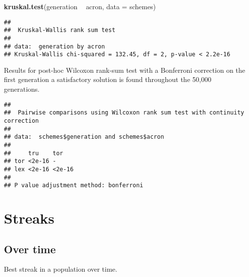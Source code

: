 \documentclass[]{book}
\newenvironment{Shaded}{\begin{snugshade}}{\end{snugshade}}
\newcommand{\DataTypeTok}[1]{\textcolor[rgb]{0.13,0.29,0.53}{#1}}
\newcommand{\KeywordTok}[1]{\textcolor[rgb]{0.13,0.29,0.53}{\textbf{#1}}}
\newcommand{\NormalTok}[1]{#1}
\newcommand{\OperatorTok}[1]{\textcolor[rgb]{0.81,0.36,0.00}{\textbf{#1}}}
\newcommand{\OtherTok}[1]{\textcolor[rgb]{0.56,0.35,0.01}{#1}}
\newcommand{\StringTok}[1]{\textcolor[rgb]{0.31,0.60,0.02}{#1}}
\begin{document}
\begin{Shaded}
\begin{Highlighting}[]
\KeywordTok{kruskal.test}\NormalTok{(generation }\OperatorTok{~}\StringTok{ }\NormalTok{acron, }\DataTypeTok{data =}\NormalTok{ schemes)}
\end{Highlighting}
\end{Shaded}

\begin{verbatim}
## 
##  Kruskal-Wallis rank sum test
## 
## data:  generation by acron
## Kruskal-Wallis chi-squared = 132.45, df = 2, p-value < 2.2e-16
\end{verbatim}

Results for post-hoc Wilcoxon rank-sum test with a Bonferroni correction on the first generation a satisfactory solution is found throughout the 50,000 generations.

\begin{Shaded}
\end{Shaded}

\begin{verbatim}
## 
##  Pairwise comparisons using Wilcoxon rank sum test with continuity correction 
## 
## data:  schemes$generation and schemes$acron 
## 
##     tru    tor   
## tor <2e-16 -     
## lex <2e-16 <2e-16
## 
## P value adjustment method: bonferroni
\end{verbatim}

\hypertarget{streaks}{%
\section{Streaks}\label{streaks}}

\hypertarget{over-time}{%
\subsection{Over time}\label{over-time}}

Best streak in a population over time.
\end{document}
